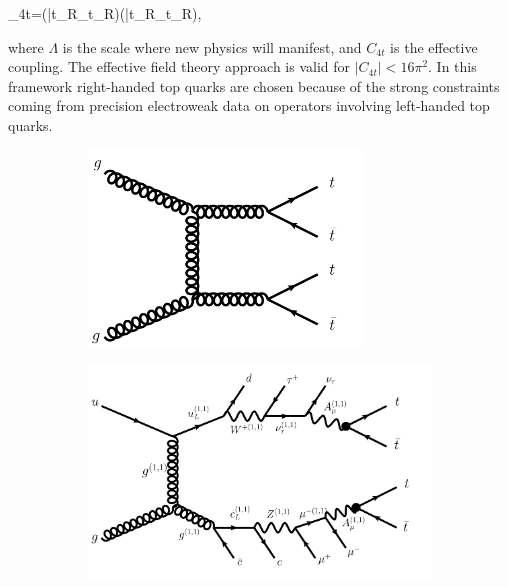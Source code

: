 \be
{}_{4t}=(\bar{t_{R}}\gamma_{\mu}t_{R})(\bar{t_{R}}\gamma_{\mu}t_{R}),
\ee 

\noindent where $\Lambda$ is the scale where new physics will manifest, and $C_{4t}$ is the effective coupling. The effective field theory approach is valid for $|C_{4t}|<16\pi^{2}$. In this framework right-handed top quarks are chosen because of the strong constraints coming from precision electroweak data on operators involving left-handed top quarks. 

\begin{figure}[t!]
\begin{subfigure}{0.33\textwidth}
  \centering
  \includegraphics[width=0.8\textwidth]{figures/Theory/fig_03a.png}
  \caption{}
  \label{fig:theo:fourtopSM}
\end{subfigure}
\begin{subfigure}{0.33\textwidth}
  \centering
  \includegraphics[width=1.15\textwidth]{figures/Theory/fig_03c.png}
  \caption{}
  \label{fig:theo:fourtopUED}
\end{subfigure}

\end{figure}
